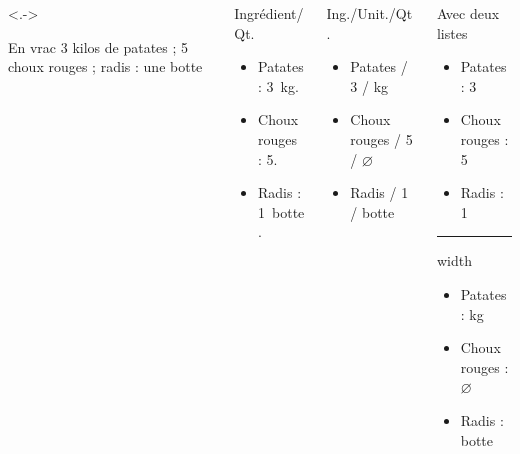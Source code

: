 \begin{slide}

  \begin{columns}[T]
    \begin{column}{0.25\textwidth}<.->
      \beamerdefaultoverlayspecification{}
      \begin{exampleblock}{En vrac}
	3 kilos de patates ; 5 choux rouges ; radis : une botte
      \end{exampleblock}	
    \end{column}

    \begin{column}{0.25\textwidth}
      \beamerdefaultoverlayspecification{}
      \begin{exampleblock}{Ingrédient/Qt.}
	\begin{itemize}
	  \item Patates : 3~kg.
	  \item Choux rouges : 5.
	  \item Radis : 1~botte.
	\end{itemize}
      \end{exampleblock}
    \end{column}

    \begin{column}{0.25\textwidth}
      \beamerdefaultoverlayspecification{}
      \begin{exampleblock}{Ing./Unit./Qt.}
	\begin{itemize}
	  \item Patates / 3 / kg
	  \item Choux rouges / 5 / $\varnothing$\
	  \item Radis / 1 / botte
	\end{itemize}
      \end{exampleblock}
    \end{column}
    \begin{column}{0.25\textwidth}
      \beamerdefaultoverlayspecification{}
      \begin{exampleblock}{Avec deux listes}
	\begin{itemize}
	  \item Patates : 3
	  \item Choux rouges : 5
	  \item Radis : 1
	\end{itemize}
	\hrule width \textwidth
	\begin{itemize}
	  \item Patates : kg
	  \item Choux rouges : $\varnothing$\
	  \item Radis : botte
	\end{itemize}
      \end{exampleblock}
    \end{column}
  \end{columns}
\end{slide}


